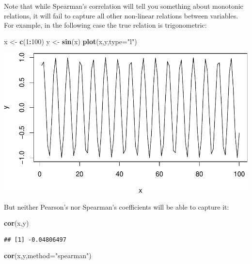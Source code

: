 \documentclass[
]{book}
\newenvironment{Shaded}{\begin{snugshade}}{\end{snugshade}}
\newcommand{\DataTypeTok}[1]{\textcolor[rgb]{0.13,0.29,0.53}{#1}}
\newcommand{\DecValTok}[1]{\textcolor[rgb]{0.00,0.00,0.81}{#1}}
\newcommand{\KeywordTok}[1]{\textcolor[rgb]{0.13,0.29,0.53}{\textbf{#1}}}
\newcommand{\NormalTok}[1]{#1}
\newcommand{\OperatorTok}[1]{\textcolor[rgb]{0.81,0.36,0.00}{\textbf{#1}}}
\newcommand{\StringTok}[1]{\textcolor[rgb]{0.31,0.60,0.02}{#1}}
\theoremstyle{definition}
\theoremstyle{definition}
\theoremstyle{definition}
\theoremstyle{definition}
\theoremstyle{remark}
\begin{document}
Note that while Spearman's correlation will tell you something about monotonic relations, it will fail to capture all other non-linear relations between variables. For example, in the following case the true relation is trigonometric:

\begin{Shaded}
\begin{Highlighting}[]
\NormalTok{x \textless{}{-}}\StringTok{ }\KeywordTok{c}\NormalTok{(}\DecValTok{1}\OperatorTok{:}\DecValTok{100}\NormalTok{)}
\NormalTok{y \textless{}{-}}\StringTok{ }\KeywordTok{sin}\NormalTok{(x)}
\KeywordTok{plot}\NormalTok{(x,y,}\DataTypeTok{type=}\StringTok{"l"}\NormalTok{)}
\end{Highlighting}
\end{Shaded}

\includegraphics{Svetunkov---Statistics-for-Business-Analytics_files/figure-latex/unnamed-chunk-52-1.pdf}

But neither Pearson's nor Spearman's coefficients will be able to capture it:

\begin{Shaded}
\begin{Highlighting}[]
\KeywordTok{cor}\NormalTok{(x,y)}
\end{Highlighting}
\end{Shaded}

\begin{verbatim}
## [1] -0.04806497
\end{verbatim}

\begin{Shaded}
\begin{Highlighting}[]
\KeywordTok{cor}\NormalTok{(x,y,}\DataTypeTok{method=}\StringTok{"spearman"}\NormalTok{)}
\end{Highlighting}
\end{Shaded}
\end{document}
